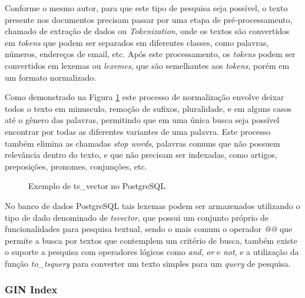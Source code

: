 Conforme o mesmo autor, para que este tipo de pesquisa seja possível, o texto presente nos documentos precisam
passar por uma etapa de pré-processamento, chamado de extração de dados ou \emph{Tokenization},
onde os textos são convertidos em \emph{tokens} que podem ser separados em diferentes classes,
como palavras, números, endereços de email, etc. Após este processamento, os \emph{tokens}
podem ser convertidos em lexemas ou \emph{lexemes}, que são semelhantes aos \emph{tokens},
porém em um formato normalizado.

Como demonstrado na Figura \ref{fig:ts-vector-exemple} este processo de normalização envolve
deixar todos o texto em minusculo, remoção de sufixos, pluralidade, e em alguns casos até o
gênero das palavras, permitindo que em uma única busca seja possível encontrar por todas as
diferentes variantes de uma palavra. Este processo também elimina as chamadas \emph{stop words},
palavras comuns que não possuem relevância dentro do texto, e que não precisam ser indexadas,
como artigos, preposições, pronomes, conjunções, etc.

\begin{figure}[H]
    \caption{Exemplo de ts\_vector no PostgreSQL}
    \centering
    \label{fig:ts-vector-exemple}
\end{figure}

No banco de dados PostgreSQL tais lexemas podem ser armazenados utilizando o tipo de
dado denominado de \emph{tsvector}, que possui um conjunto próprio de funcionalidades
para pesquisa textual, sendo o mais comum o operador \emph{@@} que permite a busca por textos
que contemplem um critério de busca, também existe o suporte a pesquisa com operadores lógicos
como \emph{and}, \emph{or} e \emph{not}, e a utilização da função \emph{to\_tsquery} para
converter um texto simples para um \emph{query} de pesquisa.

\subsubsection{GIN Index}

